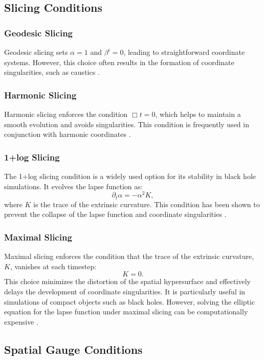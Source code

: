 \documentclass[11pt,a4paper]{article}
\begin{document}
\subsection{Slicing Conditions}
\subsubsection{Geodesic Slicing}
Geodesic slicing sets $\alpha = 1$ and $\beta^i = 0$, leading to straightforward coordinate systems. However, this choice often results in the formation of coordinate singularities, such as caustics \cite{smarr1978kinematical}.

\subsubsection{Harmonic Slicing}
Harmonic slicing enforces the condition $\Box t = 0$, which helps to maintain a smooth evolution and avoids singularities. This condition is frequently used in conjunction with harmonic coordinates \cite{bona1994gauge}.

\subsubsection{1+log Slicing}
The 1+log slicing condition is a widely used option for its stability in black hole simulations. It evolves the lapse function as:
\[
\partial_t \alpha = -\alpha^2 K,
\]
where $K$ is the trace of the extrinsic curvature. This condition has been shown to prevent the collapse of the lapse function and coordinate singularities \cite{alcubierre2000standard}.

\subsubsection{Maximal Slicing}
Maximal slicing enforces the condition that the trace of the extrinsic curvature, $K$, vanishes at each timestep:
\[
K = 0.
\]
This choice minimizes the distortion of the spatial hypersurface and effectively delays the development of coordinate singularities. It is particularly useful in simulations of compact objects such as black holes. However, solving the elliptic equation for the lapse function under maximal slicing can be computationally expensive \cite{baumgarte2010numerical}.

\subsection{Spatial Gauge Conditions}
\end{document}
